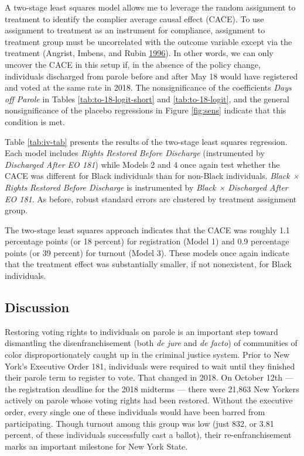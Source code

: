 \documentclass[
  12pt,
]{article}
\begin{document}
A two-stage least squares model allows me to leverage the random assignment to treatment to identify the complier average causal effect (CACE). To use assignment to treatment as an instrument for compliance, assignment to treatment group must be uncorrelated with the outcome variable except via the treatment (Angrist, Imbens, and Rubin \protect\hyperlink{ref-Angrist1996}{1996}). In other words, we can only uncover the CACE in this setup if, in the absence of the policy change, individuals discharged from parole before and after May 18 would have registered and voted at the same rate in 2018. The nonsignificance of the coefficients \emph{Days off Parole} in Tables \ref{tab:to-18-logit-short} and \ref{tab:to-18-logit}, and the general nonsignificance of the placebo regressions in Figure \ref{fig:sens} indicate that this condition is met.

Table \ref{tab:iv-tab} presents the results of the two-stage least squares regression. Each model includes \emph{Rights Restored Before Discharge} (instrumented by \emph{Discharged After EO 181}) while Models 2 and 4 once again test whether the CACE was different for Black individuals than for non-Black individuals. \emph{Black × Rights Restored Before Discharge} is instrumented by \emph{Black × Discharged After EO 181}. As before, robust standard errors are clustered by treatment assignment group.

\begin{singlespace}


\end{singlespace}

The two-stage least squares approach indicates that the CACE was roughly 1.1 percentage points (or 18 percent) for registration (Model 1) and 0.9 percentage points (or 39 percent) for turnout (Model 3). These models once again indicate that the treatment effect was substantially smaller, if not nonexistent, for Black individuals.

\hypertarget{discussion}{%
\subsection*{Discussion}\label{discussion}}

Restoring voting rights to individuals on parole is an important step toward dismantling the disenfranchisement (both \emph{de jure} and \emph{de facto}) of communities of color disproportionately caught up in the criminal justice system. Prior to New York's Executive Order 181, individuals were required to wait until they finished their parole term to register to vote. That changed in 2018. On October 12th --- the registration deadline for the 2018 midterms --- there were 21,863 New Yorkers actively on parole whose voting rights had been restored. Without the executive order, every single one of these individuals would have been barred from participating. Though turnout among this group was low (just 832, or 3.81 percent, of these individuals successfully cast a ballot), their re-enfranchisement marks an important milestone for New York State.
\end{document}
